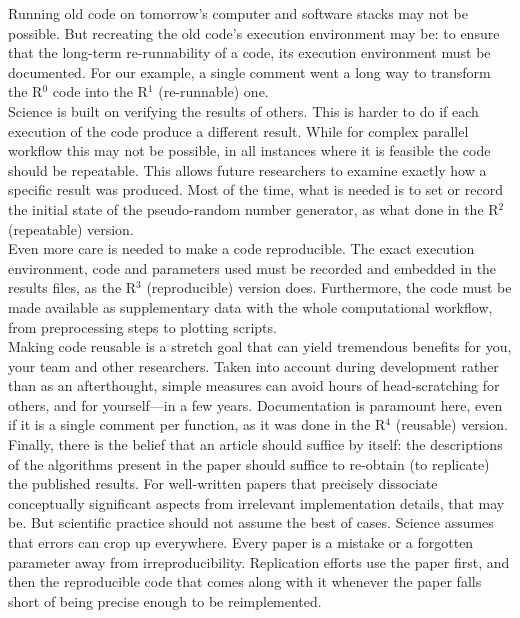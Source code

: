 \documentclass[a4paper,11pt]{article}
\begin{document}
Running old code on tomorrow’s computer and software stacks may not be possible. But recreating the old code’s execution environment may be: to ensure that the long-term re-runnability of a code, its execution environment must be documented. For our example, a single comment went a long way to transform the R$^0$ code into the R$^1$ (re-runnable) one.\\

Science is built on verifying the results of others. This is harder to do if each execution of the code produce a different result. While for complex parallel workflow this may not be possible, in all instances where it is feasible the code should be repeatable. This allows future researchers to examine exactly how a specific result was produced. Most of the time, what is needed is to set or record the initial state of the pseudo-random number generator, as what done in the R$^2$ (repeatable) version.\\

Even more care is needed to make a code reproducible. The exact execution environment, code and parameters used must be recorded and embedded in the results files, as the R$^3$ (reproducible) version does. Furthermore, the code must be made available as supplementary data with the whole computational workflow, from preprocessing steps to plotting scripts.\\

Making code reusable is a stretch goal that can yield tremendous benefits for you, your team and other researchers. Taken into account during development rather than as an afterthought, simple measures can avoid hours of head-scratching for others, and for yourself—in a few years. Documentation is paramount here, even if it is a single comment per function, as it was done in the R$^4$ (reusable) version.\\

Finally, there is the belief that an article should suffice by itself: the descriptions of the algorithms present in the paper should suffice to re-obtain (to replicate) the published results. For well-written papers that precisely dissociate conceptually significant aspects from irrelevant implementation details, that may be. But scientific practice should not assume the best of cases. Science assumes that errors can crop up everywhere. Every paper is a mistake or a forgotten parameter away from irreproducibility. Replication efforts use the paper first, and then the reproducible code that comes along with it whenever the paper falls short of being precise enough to be reimplemented.\\
\end{document}
